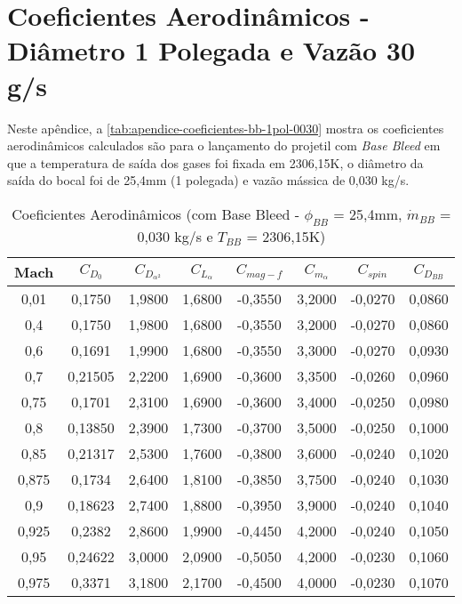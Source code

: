 \chapter{Coeficientes Aerodinâmicos - Diâmetro 1 Polegada e Vazão 30 g/s}

Neste apêndice, a \autoref{tab:apendice-coeficientes-bb-1pol-0030} mostra os coeficientes aerodinâmicos calculados são para o lançamento do projetil com \textit{Base Bleed} em que a temperatura de saída dos gases foi fixada em 2306,15K, o diâmetro da saída do bocal foi de 25,4mm (1 polegada) e vazão mássica de 0,030 kg/s.

\begin{table}[ht]
\centering
\caption[Coeficientes Aerodinâmicos (com Base Bleed - \(\phi_{BB}\) = 25,4mm, \(\Dot{m}_{BB}\) = 0,030 kg/s e \(T_{BB}\) = 2306,15K)]{Coeficientes Aerodinâmicos  (com Base Bleed - \(\phi_{BB}\) = 25,4mm, \(\Dot{m}_{BB}\) = 0,030 kg/s e \(T_{BB}\) = 2306,15K)}
\vspace{0.5cm}
\begin{tabular}{c|c|c|c|c|c|c|c}
    Mach & \(C_{D_0}\) & \(C_{D_{\alpha^2}}\) & \(C_{L_\alpha}\) & \(C_{mag-f}\) & \(C_{m_{\alpha}}\) & \(C_{spin}\) & \(C_{D_{BB}}\) \\\hline
0,01  & 0,1750  & 1,9800 & 1,6800 & -0,3550 & 3,2000 & -0,0270 & 0,0860 \\
0,4   & 0,1750  & 1,9800 & 1,6800 & -0,3550 & 3,2000 & -0,0270 & 0,0860 \\
0,6   & 0,1691  & 1,9900 & 1,6800 & -0,3550 & 3,3000 & -0,0270 & 0,0930 \\
0,7   & 0,21505 & 2,2200 & 1,6900 & -0,3600 & 3,3500 & -0,0260 & 0,0960 \\
0,75  & 0,1701  & 2,3100 & 1,6900 & -0,3600 & 3,4000 & -0,0250 & 0,0980 \\
0,8   & 0,13850 & 2,3900 & 1,7300 & -0,3700 & 3,5000 & -0,0250 & 0,1000 \\
0,85  & 0,21317 & 2,5300 & 1,7600 & -0,3800 & 3,6000 & -0,0240 & 0,1020 \\
0,875 & 0,1734  & 2,6400 & 1,8100 & -0,3850 & 3,7500 & -0,0240 & 0,1030 \\
0,9   & 0,18623 & 2,7400 & 1,8800 & -0,3950 & 3,9000 & -0,0240 & 0,1040 \\
0,925 & 0,2382  & 2,8600 & 1,9900 & -0,4450 & 4,2000 & -0,0240 & 0,1050 \\
0,95  & 0,24622 & 3,0000 & 2,0900 & -0,5050 & 4,2000 & -0,0230 & 0,1060 \\
0,975 & 0,3371  & 3,1800 & 2,1700 & -0,4500 & 4,0000 & -0,0230 & 0,1070 \\

\end{tabular}
\end{table}
